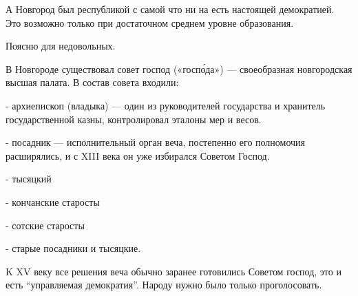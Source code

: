 \begin{itemize}
А Новгород был республикой с самой что ни на есть настоящей демократией. Это
возможно только при достаточном среднем уровне образования.


Поясню для недовольных.

В Новгороде существовал совет господ («госпо́да») — своеобразная новгородская
высшая палата. В состав совета входили:

- архиепископ (владыка) — один из руководителей государства и хранитель
государственной казны, контролировал эталоны мер и весов.

- посадник — исполнительный орган веча, постепенно его полномочия расширялись,
и с XIII века он уже избирался Советом Господ.

- тысяцкий

- кончанские старосты

- сотские старосты

- старые посадники и тысяцкие.

K XV веку все решения веча обычно заранее готовились Советом господ, это и есть
\enquote{управляемая демократия}. Народу нужно было только проголосовать.



\end{itemize}
